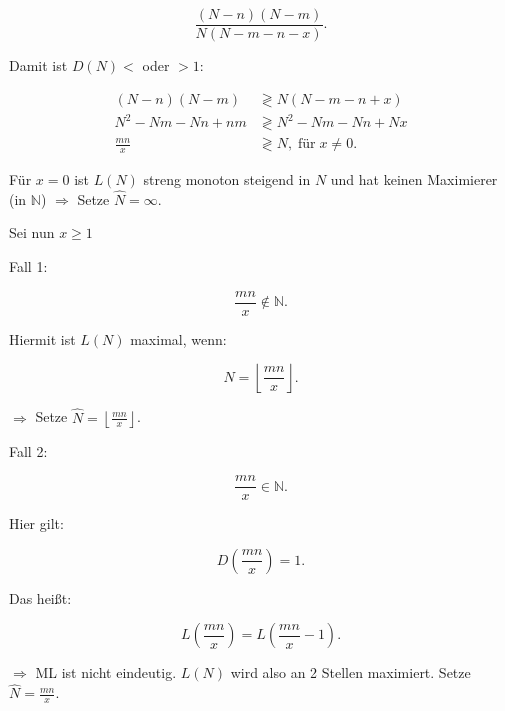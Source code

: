\documentclass[10pt]{article}
\newenvironment{BSP}[1][]
{\begin{Beispiel}[frametitle=#1]}{\end{Beispiel}}
\begin{document}
\begin{BSP}[Beispiel 1.3.9 (Schätzung der Populationsgröße mit der Capture/Recapture-Methode)]
		\begin{equation*}
			\frac{(N-n) (N-m)}{N (N - m - n -x)}.
		\end{equation*}
		
		Damit ist $D(N) <$ oder $>1$:
		
		\begin{equation*}
			\begin{split}
				(N-n) (N-m) &\gtrless  N(N-m-n+x) \\
				N^2 - Nm - Nn +nm &\gtrless N^2 -Nm-Nn+Nx\\
				\frac{mn}{x} &\gtrless N, \; \text{für} \; x\neq 0.
			\end{split}
		\end{equation*}
		
		Für $x = 0$ ist $L(N)$ streng monoton steigend in $N$ und hat keinen Maximierer (in $\mathbb{N}$) $\Rightarrow$ Setze $\hat{N} = \infty$.
		
		Sei nun $x\geq 1$
		
		Fall 1:
		
		\begin{equation*}
			\frac{mn}{x} \notin \mathbb{N}.
		\end{equation*}
		
		Hiermit ist $L(N)$ maximal, wenn:
		
		\begin{equation*}
			N = \left\lfloor \frac{mn}{x} \right\rfloor. 
		\end{equation*}
		
		$\Rightarrow$ Setze $\hat{N} = \left\lfloor \frac{mn}{x} \right\rfloor$. 
		
		Fall 2:
		
		\begin{equation*}
			\frac{mn}{x} \in \mathbb{N}.
		\end{equation*}
		
		Hier gilt:
		
		\begin{equation*}
			D\left(\frac{mn}{x}\right) = 1.
		\end{equation*}
		
		Das heißt:
		
		\begin{equation*}
			L\left(\frac{mn}{x}\right) = L\left(\frac{mn}{x} -1\right).
		\end{equation*}
		
		$\Rightarrow$ ML ist nicht eindeutig. $L(N)$ wird also an 2 Stellen maximiert. Setze $\hat{N} = \frac{mn}{x}$.
		

\end{BSP}
\end{document}
